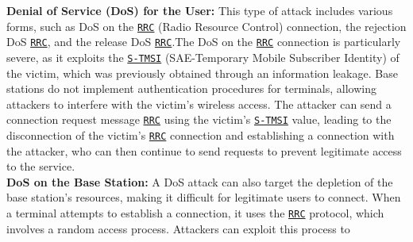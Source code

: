 \documentclass[english]{article}
\begin{document}
\textbf{Denial of Service (DoS) for the User:}
This type of attack includes various forms,
such as DoS on the \texttt{\hyperlink{RRC}{RRC}} (Radio Resource Control)
connection, the rejection DoS \texttt{\hyperlink{RRC}{RRC}}, and the release
DoS \texttt{\hyperlink{RRC}{RRC}}.\@ The DoS on the \texttt{\hyperlink{RRC}{RRC}}
connection is particularly severe, as it exploits the
\texttt{\hyperlink{S-TMSI}{S-TMSI}} (SAE-Temporary Mobile Subscriber Identity)
of the victim, which was previously obtained through an information leakage.
Base stations do not implement authentication procedures for terminals,
allowing attackers to interfere with the victim's wireless access.
The attacker can send a connection request message \texttt{\hyperlink{RRC}{RRC}}
using the victim's \texttt{\hyperlink{S-TMSI}{S-TMSI}} value, leading to the
disconnection of the victim's \texttt{\hyperlink{RRC}{RRC}} connection and
establishing a connection with the attacker, who can then continue to send
requests to prevent legitimate access to the service.
\\[0.2cm]
\textbf{DoS on the Base Station:}
A DoS attack can also target the depletion of the base station's resources,
making it difficult for legitimate users to connect. When a terminal attempts
to establish a connection, it uses the \texttt{\hyperlink{RRC}{RRC}} protocol,
which involves a random access process. Attackers can exploit this process to
\end{document}
